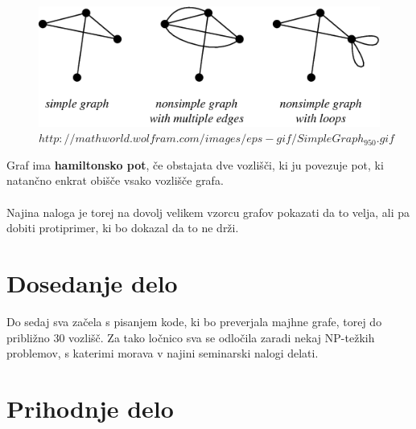 \documentclass[12pt,a4paper]{amsart}
\begin{document}
\begin{figure}[h]
	\centering
	\includegraphics[angle=270,scale=0.2]{slike/graf}
	\caption{$http://mathworld.wolfram.com/images/eps-gif/SimpleGraph_950.gif$}
\end{figure}
Graf ima \textbf{hamiltonsko pot}, če obstajata dve vozlišči, ki ju povezuje pot, ki natančno enkrat obišče vsako vozlišče grafa.\\
\ \\
Najina naloga je torej na dovolj velikem vzorcu grafov pokazati da to velja, ali pa dobiti protiprimer, ki bo dokazal da to ne drži.\\
\section{Dosedanje delo}
Do sedaj sva začela s pisanjem kode, ki bo preverjala majhne grafe, torej do približno $30$ vozlišč. Za tako ločnico sva se odločila zaradi nekaj NP-težkih problemov, s katerimi morava v najini seminarski nalogi delati.  
\section{Prihodnje delo}
\end{document}
